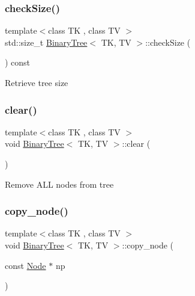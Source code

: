 \subsubsection{\texorpdfstring{checkSize()}{checkSize()}}
{\footnotesize\ttfamily template$<$class TK , class TV $>$ \\
std\+::size\+\_\+t \mbox{\hyperlink{classBinaryTree}{Binary\+Tree}}$<$ TK, TV $>$\+::check\+Size (\begin{DoxyParamCaption}{ }\end{DoxyParamCaption}) const\hspace{0.3cm}{\ttfamily [inline]}}

Retrieve tree size \mbox{\label{classBinaryTree_a264446922f6d5fe75d4a41c650f88d6a}} 
\subsubsection{\texorpdfstring{clear()}{clear()}}
{\footnotesize\ttfamily template$<$class TK , class TV $>$ \\
void \mbox{\hyperlink{classBinaryTree}{Binary\+Tree}}$<$ TK, TV $>$\+::clear (\begin{DoxyParamCaption}{ }\end{DoxyParamCaption})\hspace{0.3cm}{\ttfamily [inline]}}

Remove A\+LL nodes from tree \mbox{\label{classBinaryTree_a01dfd4a677465fbc20923794e2363b44}} 
\subsubsection{\texorpdfstring{copy\_node()}{copy\_node()}}
{\footnotesize\ttfamily template$<$class TK , class TV $>$ \\
void \mbox{\hyperlink{classBinaryTree}{Binary\+Tree}}$<$ TK, TV $>$\+::copy\+\_\+node (\begin{DoxyParamCaption}\item[{const \mbox{\hyperlink{structBinaryTree_1_1Node}{Node}} $\ast$}]{np }\end{DoxyParamCaption})}


